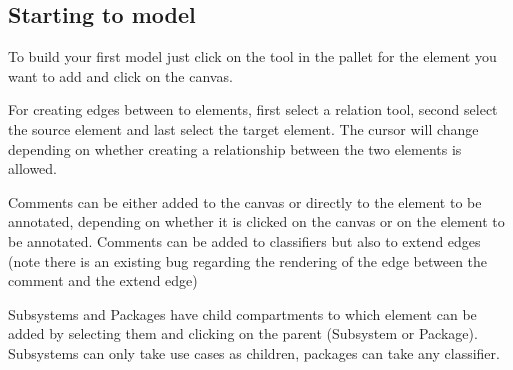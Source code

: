 \documentclass[
]{article}
\begin{document}
\hypertarget{header-n216}{%
\subsection{Starting to model}\label{header-n216}}

To build your first model just click on the tool in the pallet for the
element you want to add and click on the canvas.

For creating edges between to elements, first select a relation tool,
second select the source element and last select the target element. The
cursor will change depending on whether creating a relationship between
the two elements is allowed.

Comments can be either added to the canvas or directly to the element to
be annotated, depending on whether it is clicked on the canvas or on the
element to be annotated. Comments can be added to classifiers but also
to extend edges (note there is an existing bug regarding the rendering
of the edge between the comment and the extend edge)

Subsystems and Packages have child compartments to which element can be
added by selecting them and clicking on the parent (Subsystem or
Package). Subsystems can only take use cases as children, packages can
take any classifier.
\end{document}
